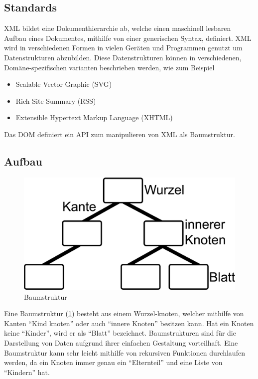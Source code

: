 \subsection{Standards}
\ac{XML} bildet eine Dokumenthierarchie ab, welche einen maschinell lesbaren Aufbau eines
Dokumentes, mithilfe von einer generischen Syntax, definiert. \ac{XML} wird in
verschiedenen Formen in vielen Geräten und Programmen genutzt um Datenstrukturen
abzubilden. Diese Datenstrukturen können in verschiedenen, Domäne-spezifischen
varianten beschrieben werden, wie zum Beispiel

\begin{itemize}
\item Scalable Vector Graphic (SVG)
\item Rich Site Summary (RSS)
\item Extensible Hypertext Markup Language (XHTML)
\end{itemize}

Das \ac{DOM} definiert ein \ac{API} zum manipulieren von \ac{XML} als
Baumstruktur. \cite{harold}

\subsection{Aufbau}
\begin{figure}
  \includegraphics[width=\linewidth]{images/binarytree.jpg}
  \caption{Baumstruktur}
  \label{fig:binarytree}
\end{figure}

Eine Baumstruktur (\ref{fig:binarytree}) besteht aus einem Wurzel-knoten,
welcher mithilfe von Kanten ``Kind knoten'' oder auch ``innere Knoten'' besitzen
kann. Hat ein Knoten keine ``Kinder'', wird er als ``Blatt'' bezeichnet.
Baumstrukturen sind für die Darstellung von Daten aufgrund ihrer einfachen
Gestaltung vorteilhaft. Eine Baumstruktur kann sehr leicht mithilfe von
rekursiven Funktionen durchlaufen werden, da ein Knoten immer genau ein
``Elternteil'' und eine Liste von ``Kindern'' hat.

